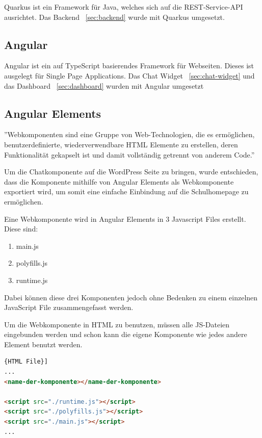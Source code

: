 Quarkus ist ein Framework für Java, welches sich auf die REST-Service-API ausrichtet.
Das Backend ~\ref{sec:backend} wurde mit Quarkus umgesetzt.

\subsection{Angular}

Angular ist ein auf TypeScript basierendes Framework für Webseiten.
Dieses ist ausgelegt für Single Page Applications.
Das Chat Widget ~\ref{sec:chat-widget} und das Dashboard ~\ref{sec:dashboard} wurden mit Angular umgesetzt

\subsection{Angular Elements}\label{subsec:angular-elements}

''Webkomponenten sind eine Gruppe von Web-Technologien, die es ermöglichen, benutzerdefinierte, wiederverwendbare HTML Elemente zu erstellen, deren Funktionalität gekapselt ist und damit vollständig getrennt von anderem Code.''\cite{webcomponents}

Um die Chatkomponente auf die WordPress Seite zu bringen, wurde entschieden, dass die Komponente mithilfe von Angular Elements als Webkomponente exportiert wird, um somit eine einfache Einbindung auf die Schulhomepage zu ermöglichen.

Eine Webkomponente wird in Angular Elements in 3 Javascript Files erstellt.
Diese sind:

\begin{enumerate}
    \item main.js
    \item polyfills.js
    \item runtime.js
\end{enumerate}

Dabei können diese drei Komponenten jedoch ohne Bedenken zu einem einzelnen JavaScript File zusammengefasst werden.

Um die Webkomponente in HTML zu benutzen, müssen alle JS-Dateien eingebunden werden und schon kann die eigene Komponente wie jedes andere Element benutzt werden.

\begin{lstlisting}[language=html,label={lst:webcomponent},caption={HTML File}]{HTML File}]
...
<name-der-komponente></name-der-komponente>

<script src="./runtime.js"></script>
<script src="./polyfills.js"></script>
<script src="./main.js"></script>
...
\end{lstlisting}

